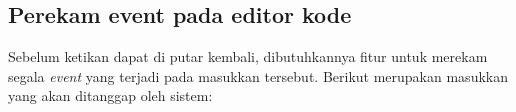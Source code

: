 
\subsection{Perekam event pada editor kode}
\label{sub:3:2:rekam}

Sebelum ketikan dapat di putar kembali, dibutuhkannya fitur untuk merekam segala \textit{event} yang terjadi pada masukkan tersebut. Berikut merupakan masukkan yang akan ditanggap oleh sistem:

